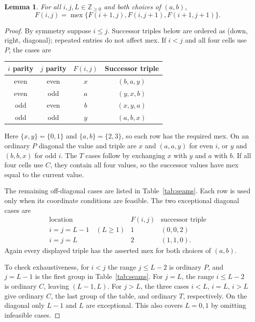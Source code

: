 \documentclass[11pt]{article}
\newtheorem{lemma}[theorem]{Lemma}
\theoremstyle{remark}
\DeclareMathOperator{\mex}{mex}
\newcommand{\N}{\mathbb{Z}_{\geq0}}
\begin{document}
\begin{lemma}\label{lem:array}
For all $i,j,L\in\N$ and both choices of $(a,b)$,
\begin{equation}\label{eq:local}
 F(i,j)=\mex\{F(i+1,j),F(i,j+1),F(i+1,j+1)\}.
\end{equation}
\end{lemma}
\begin{proof}
By symmetry suppose $i\leq j$. Successor triples below are ordered
as (down, right, diagonal); repeated entries do not affect mex.
If $i<j$ and all four cells use $P$, the cases are
\begin{center}
\begin{tabular}{cccc}
\toprule
$i$ parity&$j$ parity&$F(i,j)$&Successor triple\\
\midrule
even&even&$x$&$(b,a,y)$\\
even&odd&$a$&$(y,x,b)$\\
odd&even&$b$&$(x,y,a)$\\
odd&odd&$y$&$(a,b,x)$\\
\bottomrule
\end{tabular}
\end{center}
Here $\{x,y\}=\{0,1\}$ and $\{a,b\}=\{2,3\}$, so each row
has the required mex. On an ordinary $P$ diagonal the value and triple
are $x$ and $(a,a,y)$ for even $i$, or $y$ and $(b,b,x)$ for odd $i$.
The $T$ cases follow by exchanging $x$ with $y$ and $a$ with $b$.
If all four cells use $C$, they contain all four values, so the
successor values have mex equal to the current value.

The remaining off-diagonal cases are listed in Table~\ref{tab:seams}.
Each row is used only when its coordinate conditions are feasible.
The two exceptional diagonal cases are
\[
\begin{array}{c|c|c}
 \text{location}&F(i,j)&\text{successor triple}\\\hline
 i=j=L-1\quad(L\geq1)&1&(0,0,2)\\
 i=j=L&2&(1,1,0).
\end{array}
\]
Again every displayed triple has the asserted mex for both choices
of $(a,b)$.

To check exhaustiveness, for $i<j$ the range $j\leq L-2$ is ordinary
$P$, and $j=L-1$ is the first group in Table~\ref{tab:seams}. For
$j=L$, the range $i\leq L-2$ is ordinary $C$, leaving $(L-1,L)$.
For $j>L$, the three cases $i<L$, $i=L$, $i>L$ give ordinary $C$,
the last group of the table, and ordinary $T$, respectively. On the
diagonal only $L-1$ and $L$ are exceptional. This also covers $L=0,1$
by omitting infeasible cases.
\end{proof}
\end{document}
